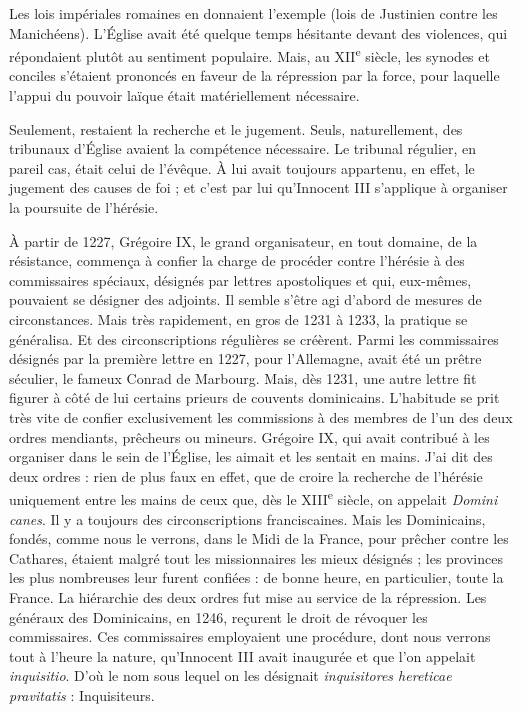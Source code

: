\documentclass[french,twoside]{book} %
\newcommand{\labelchar}[1]{{\color{rubric}\bf #1}}
\begin{document}
\noindent Les lois impériales romaines en donnaient l’exemple (lois de Justinien contre les Manichéens). L’Église avait été quelque temps hésitante devant des violences, qui répondaient plutôt au sentiment populaire. Mais, au XII\textsuperscript{e} siècle, les synodes et conciles s’étaient prononcés en faveur de la répression par la force, pour laquelle l’appui du pouvoir laïque était matériellement nécessaire.\par
\bigbreak
\noindent \labelchar{b)} Seulement, restaient la recherche et le jugement. Seuls, naturellement, des tribunaux d’Église avaient la compétence nécessaire. Le tribunal régulier, en pareil cas, était celui de l’évêque. À lui avait toujours appartenu, en effet, le jugement des causes de foi ; et c’est par lui qu’Innocent III s’applique à organiser la poursuite de l’hérésie.\par
À partir de 1227, Grégoire IX, le grand organisateur, en tout domaine, de la résistance, commença à confier la charge de procéder contre l’hérésie à des commissaires spéciaux, désignés par lettres apostoliques et qui, eux-mêmes, pouvaient se désigner des adjoints. Il semble s’être agi d’abord de mesures de circonstances. Mais très rapidement, en gros de 1231 à 1233, la pratique se généralisa. Et des circonscriptions régulières se créèrent. Parmi les commissaires désignés par la première lettre en 1227, pour l’Allemagne, avait été un prêtre séculier, le fameux Conrad de Marbourg. Mais, dès 1231, une autre lettre fit figurer à côté de lui certains prieurs de couvents dominicains. L’habitude se prit très vite de confier exclusivement les commissions à des membres de l’un des deux ordres mendiants, prêcheurs ou mineurs. Grégoire IX, qui avait contribué à les organiser dans le sein de l’Église, les aimait et les sentait en mains. J’ai dit des deux ordres : rien de plus faux en effet, que de croire la recherche de l’hérésie uniquement entre les mains de ceux que,  
\label{p105} dès le XIII\textsuperscript{e} siècle, on appelait \emph{Domini canes}. Il y a toujours des circonscriptions franciscaines. Mais les Dominicains, fondés, comme nous le verrons, dans le Midi de la France, pour prêcher contre les Cathares, étaient malgré tout les missionnaires les mieux désignés ; les provinces les plus nombreuses leur furent confiées : de bonne heure, en particulier, toute la France. La hiérarchie des deux ordres fut mise au service de la répression. Les généraux des Dominicains, en 1246, reçurent le droit de révoquer les commissaires. Ces commissaires employaient une procédure, dont nous verrons tout à l’heure la nature, qu’Innocent III avait inaugurée et que l’on appelait \emph{inquisitio}. D’où le nom sous lequel on les désignait \emph{inquisitores hereticae pravitatis} : Inquisiteurs.\par
\end{document}
